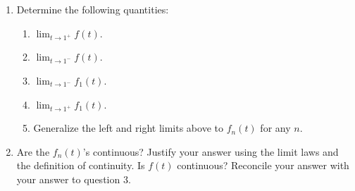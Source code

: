\documentclass{article}
\begin{document}
\begin{enumerate}
\item Determine the following quantities:
\begin{enumerate}

\item $\lim_{t \rightarrow 1^+} f(t)$.

\item $\lim_{t \rightarrow 1^-} f(t)$.

\item $\lim_{t \rightarrow 1^-} f_1(t)$.

\item $\lim_{t \rightarrow 1^+} f_1(t)$.

\item Generalize the left and right limits above to $f_n(t)$ for any $n$.

\end{enumerate}

\item Are the $f_n(t)$'s continuous?  Justify your answer using the limit
laws and the definition of continuity.  Is $f(t)$ continuous? Reconcile
  your answer with your answer to question 3.

\end{enumerate}
\end{document}
